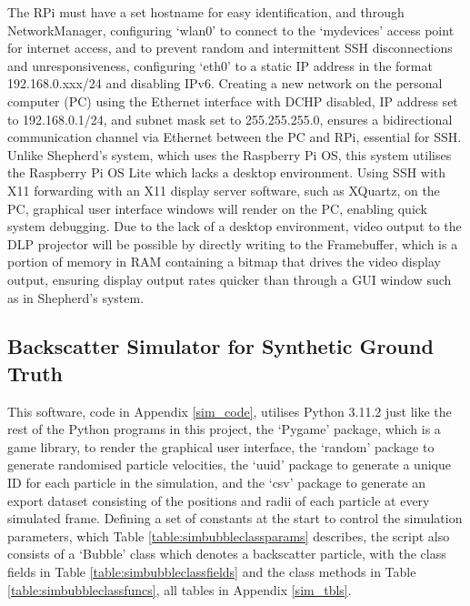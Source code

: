 The RPi must have a set hostname for easy identification, and through NetworkManager, configuring `wlan0' to connect to the `mydevices' access point for internet access, and to prevent random and intermittent SSH disconnections and unresponsiveness, configuring `eth0' to a static IP address in the format 192.168.0.xxx/24 and disabling IPv6. Creating a new network on the personal computer (PC) using the Ethernet interface with DCHP disabled, IP address set to 192.168.0.1/24, and subnet mask set to 255.255.255.0, ensures a bidirectional communication channel via Ethernet between the PC and RPi, essential for SSH. Unlike Shepherd's system, which uses the Raspberry Pi OS, this system utilises the Raspberry Pi OS Lite which lacks a desktop environment. Using SSH with X11 forwarding with an X11 display server software, such as XQuartz, on the PC, graphical user interface windows will render on the PC, enabling quick system debugging. Due to the lack of a desktop environment, video output to the DLP projector will be possible by directly writing to the Framebuffer, which is a portion of memory in RAM containing a bitmap that drives the video display output, ensuring display output rates quicker than through a GUI window such as in Shepherd's system.

\subsection{Backscatter Simulator for Synthetic Ground Truth}

This software, code in Appendix \ref{sim_code}, utilises Python 3.11.2 just like the rest of the Python programs in this project, the `Pygame' package, which is a game library, to render the graphical user interface, the `random' package to generate randomised particle velocities, the `uuid' package to generate a unique ID for each particle in the simulation, and the `csv' package to generate an export dataset consisting of the positions and radii of each particle at every simulated frame. Defining a set of constants at the start to control the simulation parameters, which Table \ref{table:simbubbleclassparams} describes, the script also consists of a `Bubble' class which denotes a backscatter particle, with the class fields in Table \ref{table:simbubbleclassfields} and the class methods in Table \ref{table:simbubbleclassfuncs}, all tables in Appendix \ref{sim_tbls}.

